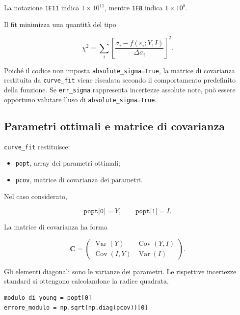 \documentclass[11pt,a4paper]{book}
\begin{document}
La notazione \texttt{1E11} indica $1\times 10^{11}$, mentre \texttt{1E8} indica $1\times 10^8$.

Il fit minimizza una quantità del tipo

\begin{equation}
    \chi^2=\sum_i
    \left[
    \frac{\sigma_i-f(\varepsilon_i;Y,I)}{\Delta\sigma_i}
    \right]^2.
\end{equation}

Poiché il codice non imposta \texttt{absolute\_sigma=True}, la matrice di covarianza restituita da \texttt{curve\_fit} viene riscalata secondo il comportamento predefinito della funzione. Se \texttt{err\_sigma} rappresenta incertezze assolute note, può essere opportuno valutare l'uso di \texttt{absolute\_sigma=True}.

\subsection{Parametri ottimali e matrice di covarianza}

\texttt{curve\_fit} restituisce:

\begin{itemize}
    \item \texttt{popt}, array dei parametri ottimali;
    \item \texttt{pcov}, matrice di covarianza dei parametri.
\end{itemize}

Nel caso considerato,

\begin{equation}
    \texttt{popt[0]}=Y,
    \qquad
    \texttt{popt[1]}=I.
\end{equation}

La matrice di covarianza ha forma

\begin{equation}
    \mathbf{C}=
    \begin{pmatrix}
    \operatorname{Var}(Y) & \operatorname{Cov}(Y,I)\\
    \operatorname{Cov}(I,Y) & \operatorname{Var}(I)
    \end{pmatrix}.
\end{equation}

Gli elementi diagonali sono le varianze dei parametri. Le rispettive incertezze standard si ottengono calcolandone la radice quadrata.

\begin{lstlisting}
modulo_di_young = popt[0]
errore_modulo = np.sqrt(np.diag(pcov))[0]
\end{lstlisting}
\end{document}
